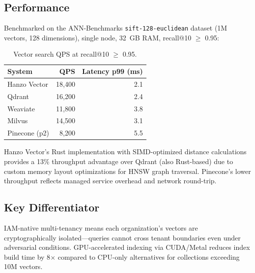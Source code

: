 \subsection{Performance}

Benchmarked on the ANN-Benchmarks \texttt{sift-128-euclidean} dataset (1M vectors, 128 dimensions), single node, 32~GB RAM, recall@10 $\geq$ 0.95:

\begin{table}[H]
\centering
\caption{Vector search QPS at recall@10 $\geq$ 0.95.}
\footnotesize
\begin{tabular}{@{}lrr@{}}
\toprule
System & QPS & Latency p99 (ms) \\
\midrule
Hanzo Vector & 18,400 & 2.1 \\
Qdrant & 16,200 & 2.4 \\
Weaviate & 11,800 & 3.8 \\
Milvus & 14,500 & 3.1 \\
Pinecone (p2) & 8,200 & 5.5 \\
\bottomrule
\end{tabular}
\end{table}

Hanzo Vector's Rust implementation with SIMD-optimized distance calculations provides a 13\% throughput advantage over Qdrant (also Rust-based) due to custom memory layout optimizations for HNSW graph traversal. Pinecone's lower throughput reflects managed service overhead and network round-trip.

\subsection{Key Differentiator}

IAM-native multi-tenancy means each organization's vectors are cryptographically isolated---queries cannot cross tenant boundaries even under adversarial conditions. GPU-accelerated indexing via CUDA/Metal reduces index build time by 8$\times$ compared to CPU-only alternatives for collections exceeding 10M vectors.

